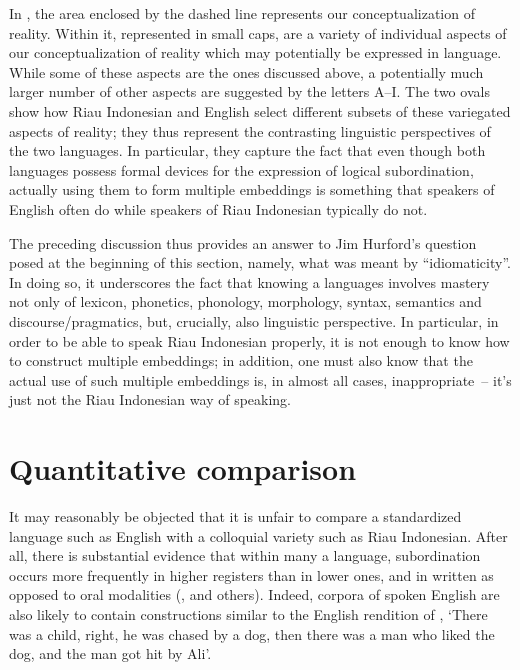 \documentclass[output=paper,colorlinks,citecolor=brown
]{langscibook}
\begin{document}
In , the area enclosed by the dashed line represents our conceptualization of reality.  Within it, represented in small caps, are a variety of individual aspects of our conceptualization of reality which may potentially be expressed in language.  While some of these aspects are the ones discussed above, a potentially much larger number of other aspects are suggested by the letters A–I.  The two ovals show how Riau Indonesian and English select different subsets of these variegated aspects of reality; they thus represent the contrasting linguistic perspectives of the two languages.  In particular, they capture the fact that even though both languages possess formal devices for the expression of logical subordination, actually using them to form multiple embeddings is something that speakers of English often do while speakers of Riau Indonesian typically do not.

The preceding discussion thus provides an answer to Jim Hurford's question posed at the beginning of this section, namely, what was meant by ``idiomaticity''.  In doing so, it underscores the fact that knowing a languages involves mastery not only of lexicon, phonetics, phonology, morphology, syntax, semantics and discourse/pragmatics, but, crucially, also linguistic perspective.  In particular, in order to be able to speak Riau Indonesian properly, it is not enough to know how to construct multiple embeddings; in addition, one must also know that the actual use of such multiple embeddings is, in almost all cases, inappropriate~– it's just not the Riau Indonesian way of speaking.

\section{Quantitative comparison}
It may reasonably be objected that it is unfair to compare a standardized language such as English with a colloquial variety such as Riau Indonesian.  After all, there is substantial evidence that within many a language, subordination occurs more frequently in higher registers than in lower ones, and in written as opposed to oral modalities (\citealt{givon1979understanding,deutscher2000syntactic,karlsson2009aorigin,karlsson2009bsyntactic}, and others). Indeed, corpora of spoken English are also likely to contain constructions similar to the English rendition of , `There was a child, right, he was chased by a dog, then there was a man who liked the dog, and the man got hit by Ali'. 
\end{document}
